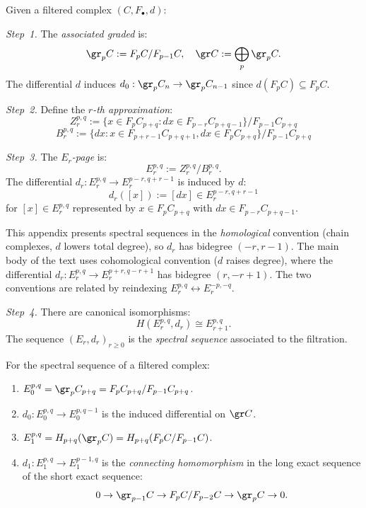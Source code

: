 \begin{construction}
\label{constr:ass-graded-ss}
Given a filtered complex $(C, F_\bullet, d)$:

\emph{Step~1.} The \emph{associated graded} is:
\[
\gr_p C := F_p C / F_{p-1} C, \quad \gr C := \bigoplus_p \gr_p C.
\]
The differential $d$ induces $d_0: \gr_p C_n \to \gr_p C_{n-1}$ since 
$d(F_p C) \subseteq F_p C$.

\emph{Step~2.} Define the \emph{$r$-th approximation}:
\[
Z_r^{p,q} := \{x \in F_p C_{p+q} : dx \in F_{p-r} C_{p+q-1}\} / F_{p-1} C_{p+q}
\]
\[
B_r^{p,q} := \{dx : x \in F_{p+r-1} C_{p+q+1}, dx \in F_p C_{p+q}\} / F_{p-1} C_{p+q}
\]

\emph{Step~3.} The \emph{$E_r$-page} is:
\[
E_r^{p,q} := Z_r^{p,q} / B_r^{p,q}.
\]
The differential $d_r: E_r^{p,q} \to E_r^{p-r, q+r-1}$ is induced by $d$:
\[
d_r([x]) := [dx] \in E_r^{p-r, q+r-1}
\]
for $[x] \in E_r^{p,q}$ represented by $x \in F_p C_{p+q}$ with $dx \in F_{p-r} C_{p+q-1}$.

\begin{remark}[Convention]
This appendix presents spectral sequences in the \emph{homological} convention (chain complexes, $d$ lowers total degree), so $d_r$ has bidegree $(-r, r-1)$. The main body of the text uses cohomological convention ($d$ raises degree), where the differential $d_r: E_r^{p,q} \to E_r^{p+r, q-r+1}$ has bidegree $(r, -r+1)$. The two conventions are related by reindexing $E_r^{p,q} \leftrightarrow E_r^{-p,-q}$.
\end{remark}

\emph{Step~4.} There are canonical isomorphisms:
\[
H(E_r^{p,q}, d_r) \cong E_{r+1}^{p,q}.
\]
The sequence $(E_r, d_r)_{r \geq 0}$ is the \emph{spectral sequence} associated 
to the filtration.
\end{construction}

\begin{theorem}
\label{thm:early-pages}
For the spectral sequence of a filtered complex:
\begin{enumerate}[label=(\roman*)]
\item $E_0^{p,q} = \gr_p C_{p+q} = F_p C_{p+q} / F_{p-1} C_{p+q}$.
\item $d_0: E_0^{p,q} \to E_0^{p, q-1}$ is the induced differential on $\gr C$.
\item $E_1^{p,q} = H_{p+q}(\gr_p C) = H_{p+q}(F_p C / F_{p-1} C)$.
\item $d_1: E_1^{p,q} \to E_1^{p-1, q}$ is the \emph{connecting homomorphism} 
in the long exact sequence of the short exact sequence:
\[
0 \to \gr_{p-1} C \to F_p C / F_{p-2} C \to \gr_p C \to 0.
\]
\end{enumerate}
\end{theorem}


